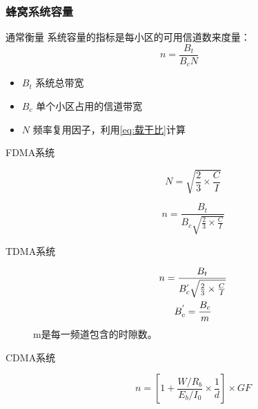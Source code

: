 \documentclass[a4paper ]{report}
\begin{document}
	\subsubsection{蜂窝系统容量}
	通常衡量
	系统容量的指标是每小区的可用信道数来度量：
	\begin{equation}
		n = \frac{B_t}{B_cN}
	\end{equation}
	\begin{itemize}
		\item $B_t$ 系统总带宽
		\item $B_c$ 单个小区占用的信道带宽
		\item $N$ 频率复用因子，利用\ref{eq:载干比}计算
	\end{itemize}
	\begin{description}
		\item[FDMA系统] 
		
		\begin{equation*}
			N = \sqrt{\frac{2}{3}\times \frac{C}{I}}
		\end{equation*}
		
		\begin{equation}
		n = \frac{B_t}{B_c\sqrt{\frac{2}{3}\times \frac{C}{I}}}
		\end{equation}
		\item [TDMA系统]
		\begin{gather}
			n = \frac{B_t}{B_c^{'}\sqrt{\frac{2}{3}\times \frac{C}{I}}} \notag \\
			B_c^{'} = \frac{B_c}{m}
		\end{gather}
		m是每一频道包含的时隙数。
		\item[CDMA系统] 
		\begin{equation}
		n = [1+\frac{W/R_b}{E_b/I_0}\times \frac{1}{d}]\times G F
		\end{equation}
	\end{description}
\end{document}
